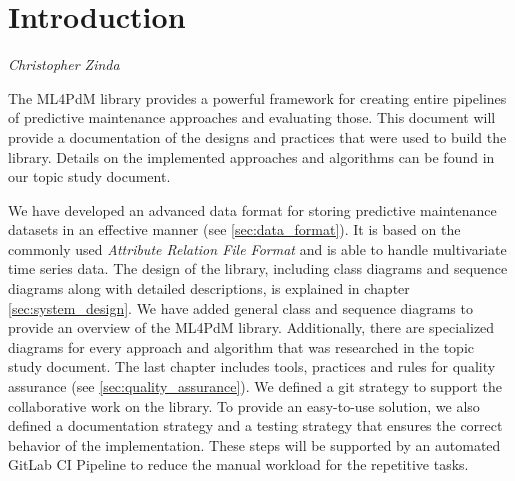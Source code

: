 %
\chapter{Introduction}
\vspace*{-10mm}\hfill{\normalsize\emph{Christopher Zinda}}
\label{sec:intro}

The ML4PdM library provides a powerful framework for creating entire pipelines of predictive maintenance approaches and evaluating those. This document will provide a documentation of the designs and practices that were used to build the library. Details on the implemented approaches and algorithms can be found in our topic study document.

We have developed an advanced data format for storing predictive maintenance datasets in an effective manner (see \ref{sec:data_format}). It is based on the commonly used \textit{Attribute Relation File Format} and is able to handle multivariate time series data. The design of the library, including class diagrams and sequence diagrams along with detailed descriptions, is explained in chapter \ref{sec:system_design}. We have added general class and sequence diagrams to provide an overview of the ML4PdM library. Additionally, there are specialized diagrams for every approach and algorithm that was researched in the topic study document. The last chapter includes tools, practices and rules for quality assurance (see \ref{sec:quality_assurance}). We defined a git strategy to support the collaborative work on the library. To provide an easy-to-use solution, we also defined a documentation strategy and a testing strategy that ensures the correct behavior of the implementation. These steps will be supported by an automated GitLab CI Pipeline to reduce the manual workload for the repetitive tasks.
